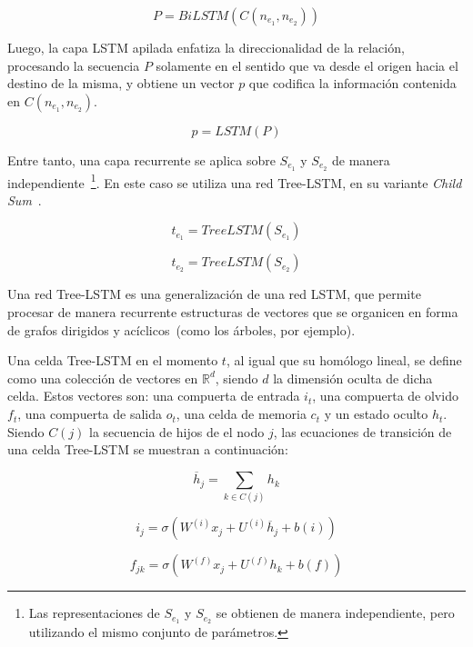 \begin{equation*}
	P = BiLSTM(C(n_{e_1}, n_{e_2}))
\end{equation*}

Luego, la capa LSTM apilada enfatiza la direccionalidad de la relación, procesando la secuencia $P$ solamente en el sentido que va desde el origen hacia el destino de la misma, y obtiene un vector $p$ que codifica la información contenida en $C(n_{e_1}, n_{e_2})$.

\begin{equation*}
	p = LSTM(P)
\end{equation*}

Entre tanto, una capa recurrente se aplica sobre $S_{e_1}$ y $S_{e_2}$ de manera independiente~\footnote{Las representaciones de $S_{e_1}$ y $S_{e_2}$ se obtienen de manera independiente, pero utilizando el mismo conjunto de parámetros.}.
En este caso se utiliza una red Tree-LSTM, en su variante \textit{Child Sum}~\cite{tai2015improved}.

\begin{equation*}
	t_{e_1} = TreeLSTM(S_{e_1})
\end{equation*}


\begin{equation*}
	t_{e_2} = TreeLSTM(S_{e_2})
\end{equation*}


Una red Tree-LSTM es una generalización de una red LSTM, que permite procesar de manera recurrente estructuras de vectores que se organicen en forma de grafos dirigidos y acíclicos~(como los árboles, por ejemplo).

Una celda Tree-LSTM en el momento $t$, al igual que su homólogo lineal, se define como una colección de vectores en $\mathbb{R}^d$, siendo $d$ la dimensión oculta de dicha celda.
Estos vectores son: una compuerta de entrada $i_t$, una compuerta de olvido $f_t$, una compuerta de salida $o_t$, una celda de memoria $c_t$ y un estado oculto $h_t$. Siendo $C(j)$ la secuencia de hijos de el nodo $j$, las ecuaciones de transición de una celda Tree-LSTM se muestran a continuación:

\begin{equation*}
	\overline{h}_j = \sum_{k\in C(j)} h_k
\end{equation*}

\begin{equation*}
i_j = \sigma(W^{(i)}x_j + U^{(i)}\overline{h}_j + b(i))
\end{equation*}

\begin{equation*}
f_{jk} = \sigma(W^{(f)}x_j + U^{(f)}h_k + b(f))
\end{equation*}

